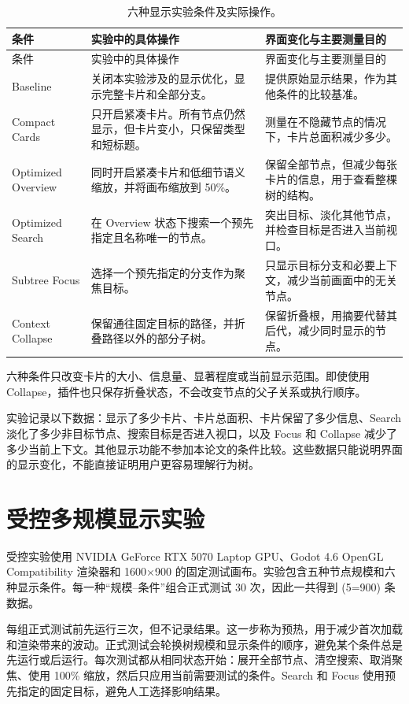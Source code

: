 \begin{longtable}{p{}p{}p{}}
\caption{六种显示实验条件及实际操作。}\label{tab:displayconditions}\\
\toprule 条件 & 实验中的具体操作 & 界面变化与主要测量目的 \\ \midrule\endfirsthead
\toprule 条件 & 实验中的具体操作 & 界面变化与主要测量目的 \\ \midrule\endhead
Baseline & 关闭本实验涉及的显示优化，显示完整卡片和全部分支。 & 提供原始显示结果，作为其他条件的比较基准。\\
Compact Cards & 只开启紧凑卡片。所有节点仍然显示，但卡片变小，只保留类型和短标题。 & 测量在不隐藏节点的情况下，卡片总面积减少多少。\\
Optimized Overview & 同时开启紧凑卡片和低细节语义缩放，并将画布缩放到 50\%。 & 保留全部节点，但减少每张卡片的信息，用于查看整棵树的结构。\\
Optimized Search & 在 Overview 状态下搜索一个预先指定且名称唯一的节点。 & 突出目标、淡化其他节点，并检查目标是否进入当前视口。\\
Subtree Focus & 选择一个预先指定的分支作为聚焦目标。 & 只显示目标分支和必要上下文，减少当前画面中的无关节点。\\
Context Collapse & 保留通往固定目标的路径，并折叠路径以外的部分子树。 & 保留折叠根，用摘要代替其后代，减少同时显示的节点。\\
\bottomrule
\end{longtable}

六种条件只改变卡片的大小、信息量、显著程度或当前显示范围。即使使用 Collapse，插件也只保存折叠状态，不会改变节点的父子关系或执行顺序。

实验记录以下数据：显示了多少卡片、卡片总面积、卡片保留了多少信息、Search 淡化了多少非目标节点、搜索目标是否进入视口，以及 Focus 和 Collapse 减少了多少当前上下文。其他显示功能不参加本论文的条件比较。这些数据只能说明界面的显示变化，不能直接证明用户更容易理解行为树。

\section{受控多规模显示实验}

受控实验使用 NVIDIA GeForce RTX 5070 Laptop GPU、Godot 4.6 OpenGL Compatibility 渲染器和 1600×900 的固定测试画布。实验包含五种节点规模和六种显示条件。每一种“规模--条件”组合正式测试 30 次，因此一共得到 (5=900) 条数据。

每组正式测试前先运行三次，但不记录结果。这一步称为预热，用于减少首次加载和渲染带来的波动。正式测试会轮换树规模和显示条件的顺序，避免某个条件总是先运行或后运行。每次测试都从相同状态开始：展开全部节点、清空搜索、取消聚焦、使用 100\% 缩放，然后只应用当前需要测试的条件。Search 和 Focus 使用预先指定的固定目标，避免人工选择影响结果。

